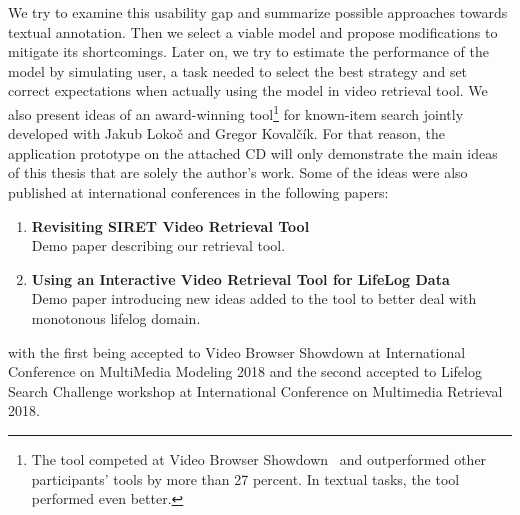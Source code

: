 We try to examine this usability gap and summarize possible approaches towards textual annotation. Then we select a viable model and propose modifications to mitigate its shortcomings. Later on, we try to estimate the performance of the model by simulating user, a task needed to select the best strategy and set correct expectations when actually using the model in video retrieval tool. We also present ideas of an award-winning tool\footnote{The tool competed at Video Browser Showdown~\cite{cobarzan2017interactive} and outperformed other participants' tools by more than 27 percent. In textual tasks, the tool performed even better.} for known-item search jointly developed with Jakub Lokoč and Gregor Kovalčík. For that reason, the application prototype on the attached CD will only demonstrate the main ideas of this thesis that are solely the author's work. Some of the ideas were also published at international conferences in the following papers:
\begin{enumerate}
	\item \textbf{Revisiting SIRET Video Retrieval Tool}~\cite{lokovc2018revisiting}\\
	Demo paper describing our retrieval tool.
	\item \textbf{Using an Interactive Video Retrieval Tool for LifeLog Data}~\cite{LokocLSC}\\
	Demo paper introducing new ideas added to the tool to better deal with monotonous lifelog domain.
\end{enumerate}
with the first being accepted to Video Browser Showdown at International Conference on MultiMedia Modeling 2018 and the second accepted to Lifelog Search Challenge workshop at International Conference on Multimedia Retrieval 2018.
